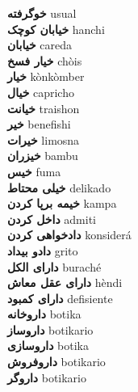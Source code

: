 \textbf{ خوگرفته  } usual \\
\textbf{ خیابان کوچک  } hanchi \\
\textbf{ خیابان  } careda \\
\textbf{ خیار فسخ  } chòis \\
\textbf{ خیار  } kònkòmber \\
\textbf{ خیال  } capricho \\
\textbf{ خیانت  } traishon \\
\textbf{ خیر  } benefishi \\
\textbf{ خیرات  } limosna \\
\textbf{ خیزران  } bambu \\
\textbf{ خیس  } fuma \\
\textbf{ خیلی محتاط  } delikado \\
\textbf{ خیمه برپا کردن  } kampa \\
\textbf{ داخل کردن  } admiti \\
\textbf{ دادخواهی کردن  } konsiderá \\
\textbf{ دادو بیداد  } grito \\
\textbf{ دارای الکل  } buraché \\
\textbf{ دارای عقل معاش  } hèndi \\
\textbf{ دارای کمبود  } defisiente \\
\textbf{ داروخانه  } botika \\
\textbf{ داروساز  } botikario \\
\textbf{ داروسازی  } botika \\
\textbf{ داروفروش  } botikario \\
\textbf{ داروگر  } botikario \\
